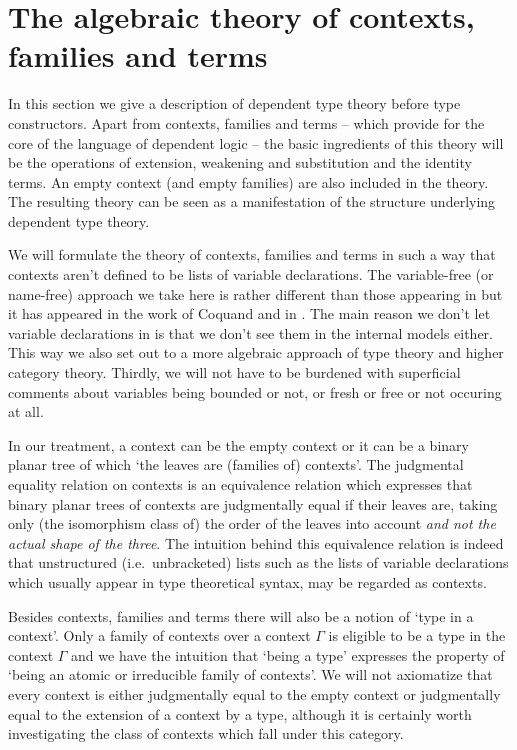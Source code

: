 \section{The algebraic theory of contexts, families and terms}\label{tt}
In this section we give a description of dependent type theory before type
constructors. Apart from contexts, families and terms -- which provide for the
core of the language of dependent logic -- the basic ingredients
of this theory will be the operations of extension, weakening and substitution
and the identity terms. An empty context (and empty families) are also included
in the theory. The resulting theory can be seen as a manifestation of the 
structure underlying dependent type theory.

We will
formulate the theory of contexts, families and terms in such a way that contexts aren't defined
to be lists of variable declarations. The variable-free (or name-free) approach 
we take here is rather different than those appearing in 
\cite{hofmann1995extensional,TheBook} but it has appeared in the work of Coquand
and in \cite{Dybjer1996}.
The main reason we don't let variable declarations in is that we don't see them 
in the internal models either. This way we also set out to a more algebraic 
approach of type theory and higher category theory. Thirdly, we will not have to
be burdened with superficial comments about variables being bounded or not, or 
fresh or free or not occuring at all.

In our treatment, a context can be the empty context or it can be a binary
planar tree of which `the leaves are (families of) contexts'. 
The judgmental equality relation on contexts is an equivalence relation which 
expresses that binary planar
trees of contexts are judgmentally equal if their leaves are, taking only
(the isomorphism class of) 
the order of the leaves into account \emph{and not the actual shape of the three}.
The intuition behind this equivalence relation is indeed that unstructured
(i.e.~unbracketed) lists such as the lists of variable declarations which
usually appear in type theoretical syntax, may be regarded as contexts.

Besides contexts, families and terms there will also be a notion of `type in
a context'. Only a family of contexts over a context $\Gamma$ is eligible to
be a type in the context $\Gamma$ and we have the intuition that `being a type'
expresses the property of `being an atomic or irreducible family of contexts'.
We will not axiomatize that every context is either judgmentally equal to the
empty context or judgmentally equal to the extension of a context by a type,
although it is certainly worth investigating the class of contexts which fall
under this category.


